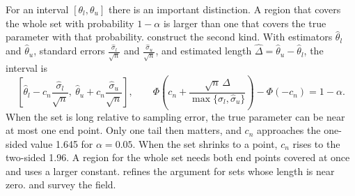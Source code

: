 For an interval $[\theta_l,\theta_u]$ there is an important distinction. A region that covers the whole
set with probability $1-\alpha$ is larger than one that covers the true parameter with that probability.
\citet{ImbensManski2004} construct the second kind. With estimators $\hat\theta_l$ and $\hat\theta_u$,
standard errors $\frac{\hat\sigma_l}{\sqrt n}$ and $\frac{\hat\sigma_u}{\sqrt n}$, and estimated length
$\hat\Delta=\hat\theta_u-\hat\theta_l$, the interval is
\begin{equation}\label{eq:A-im}
\left[\hat\theta_l-c_n\frac{\hat\sigma_l}{\sqrt n},\ \hat\theta_u+c_n\frac{\hat\sigma_u}{\sqrt n}\right],\qquad
\Phi\!\left(c_n+\frac{\sqrt n\,\hat\Delta}{\max\{\hat\sigma_l,\hat\sigma_u\}}\right)-\Phi(-c_n)=1-\alpha .
\end{equation}
When the set is long relative to sampling error, the true parameter can be near at most one end point.
Only one tail then matters, and $c_n$ approaches the one-sided value 1.645 for $\alpha=0.05$. When the set
shrinks to a point, $c_n$ rises to the two-sided 1.96. A region for the whole set needs both end
points covered at once and uses a larger constant. \citet{Stoye2009} refines the argument for sets whose
length is near zero. \citet{Manski2003} and \citet{Tamer2010} survey the field.
